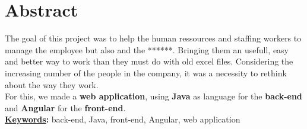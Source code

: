 \section{Abstract}

The goal of this project was to help the human ressources and staffing workers to manage the employee but also and the ******. Bringing them an usefull, easy and better way to work than they must do with old excel files. Considering the increasing number of the people in the company, it was a necessity to rethink about the way they work.\\

\noindent For this, we made a \textbf{web application}, using \textbf{Java} as language for the \textbf{back-end} and \textbf{Angular} for the \textbf{front-end}. \\


\noindent\textbf{\underline{Keywords}:} back-end, Java, front-end, Angular, web application